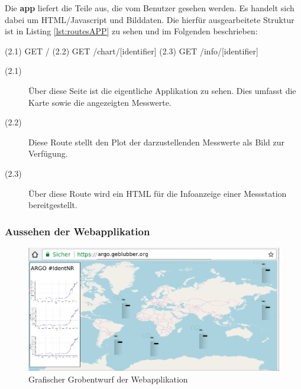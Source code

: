 Die \textbf{app} liefert die Teile aus, die vom Benutzer gesehen werden. Es handelt sich dabei um HTML/Javascript und Bilddaten. Die hierfür ausgearbeitete Struktur ist in Listing \ref{lst:routesAPP} zu sehen und im Folgenden beschrieben:

\begin{python}[label={lst:routesAPP}, caption={Webrouten der APP}]
(2.1) GET     /
(2.2) GET     /chart/[identifier]
(2.3) GET     /info/[identifier]
\end{python}

\begin{description}
 \item [(2.1)] 
 Über diese Seite ist die eigentliche Applikation zu sehen. Dies umfasst die Karte sowie die angezeigten Messwerte. 
 
 \item [(2.2)] 
 Diese Route stellt den Plot der darzustellenden Messwerte als Bild zur Verfügung.
 
 \item [(2.3)]
 Über diese Route wird ein HTML für die Infoanzeige einer Messstation bereitgestellt. 
 
\end{description}



\subsubsection{Aussehen der Webapplikation}
%
%

\begin{figure}[h!]
    \centering
    \includegraphics[width=\textwidth]{pix/EntwurfWebseite.png}
    \caption{Grafischer Grobentwurf der Webapplikation}
    \label{fig:entwurf_webseite}
\end{figure}


